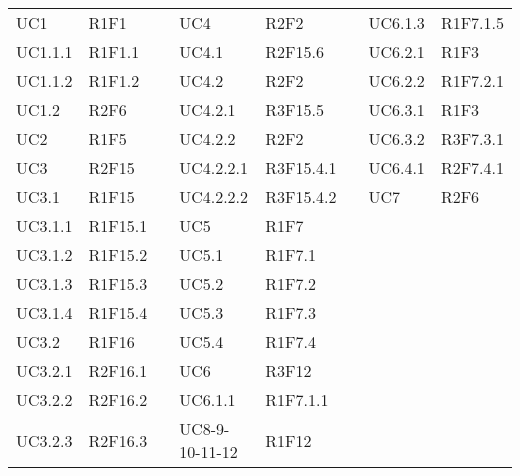 {\begin{longtable}{C{2cm} | C{2cm} C{0.5cm} C{2cm} | C{2cm} C{0.5cm} C{2cm} C{2cm}}
UC1 & R1F1 &  & UC4 & R2F2 &  & UC6.1.3 & R1F7.1.5\\
UC1.1.1 & R1F1.1 &  & UC4.1 & R2F15.6 &  & UC6.2.1 & R1F3\\
UC1.1.2 & R1F1.2 &  & UC4.2 & R2F2 &  & UC6.2.2 & R1F7.2.1\\
UC1.2 & R2F6 &  & UC4.2.1 & R3F15.5 &  & UC6.3.1 & R1F3\\
UC2 & R1F5 &  & UC4.2.2 & R2F2 &   & UC6.3.2 & R3F7.3.1\\
UC3 & R2F15 &  & UC4.2.2.1 & R3F15.4.1 &  & UC6.4.1 & R2F7.4.1\\
UC3.1 & R1F15 &  & UC4.2.2.2 & R3F15.4.2 &  & UC7 & R2F6\\
UC3.1.1 & R1F15.1 &  & UC5 & R1F7 &  &  & \\
UC3.1.2 & R1F15.2 &  & UC5.1 & R1F7.1 &  &  & \\
UC3.1.3 & R1F15.3 &  & UC5.2 & R1F7.2 &  & &\\
UC3.1.4 & R1F15.4 &  & UC5.3 & R1F7.3 &  & &\\
UC3.2 & R1F16 &  & UC5.4 & R1F7.4 &  & &\\
UC3.2.1 & R2F16.1 &  & UC6 & R3F12 &  & &\\
UC3.2.2 & R2F16.2 &  & UC6.1.1 & R1F7.1.1 &  & &\\
UC3.2.3 & R2F16.3 &  & UC8-9-10-11-12 & R1F12 &  & &\\

\end{longtable}
}